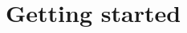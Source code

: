 


\newcommand{\command}[1]{\mbox{\texttt{#1}}}



\maketitle
\newpage

\tableofcontents
\newpage

\section{Getting started}
\label{sec:getting_started}

